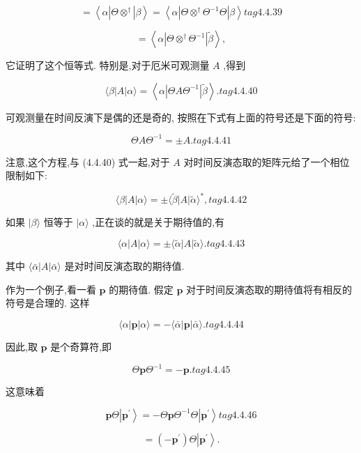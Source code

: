$$
= \left\langle {\alpha \left| {\Theta { \otimes }^{ \dagger }}\right| \beta }\right\rangle = \left\langle {\alpha \left| {\Theta { \otimes }^{ \dagger }{\Theta }^{-1}\Theta }\right| \beta }\right\rangle tag{4. 4.39}
$$

$$
= \left\langle {\alpha \left| {\Theta { \otimes }^{ \dagger }{\Theta }^{-1}}\right| \widetilde{\beta }}\right\rangle ,
$$

它证明了这个恒等式. 特别是,对于厄米可观测量 $A$ ,得到

$$
\langle \beta \left| A\right| \alpha \rangle = \left\langle {\alpha \left| {{\Theta A}{\Theta }^{-1}}\right| \widetilde{\beta }}\right\rangle . tag{4.4.40}
$$

可观测量在时间反演下是偶的还是奇的, 按照在下式有上面的符号还是下面的符号:

$$
{\Theta A}{\Theta }^{-1} = \pm A. tag{4.4.41}
$$

注意,这个方程,与 (4.4.40) 式一起,对于 $A$ 对时间反演态取的矩阵元给了一个相位限制如下:

$$
\langle \beta \left| A\right| \alpha \rangle = \pm \langle \widetilde{\beta }\left| A\right| \widetilde{\alpha }{\rangle }^{ * }, tag{4.4.42}
$$

如果 $|\beta \rangle$ 恒等于 $|\alpha \rangle$ ,正在谈的就是关于期待值的,有

$$
\langle \alpha \left| A\right| \alpha \rangle = \pm \langle \widetilde{\alpha }\left| A\right| \widetilde{\alpha }\rangle . tag{4. 4.43}
$$

其中 $\langle \bar{\alpha }\left| A\right| \bar{\alpha }\rangle$ 是对时间反演态取的期待值.

作为一个例子,看一看 $\mathbf{p}$ 的期待值. 假定 $\mathbf{p}$ 对于时间反演态取的期待值将有相反的符号是合理的. 这样

$$
\langle \alpha \left| \mathbf{p}\right| \alpha \rangle = - \langle \bar{\alpha }\left| \mathbf{p}\right| \bar{\alpha }\rangle . tag{4.4.44}
$$

因此,取 $\mathbf{p}$ 是个奇算符,即

$$
\Theta \mathbf{p}{\Theta }^{-1} = - \mathbf{p}. tag{4.4.45}
$$

这意味着

$$
\mathbf{p}\Theta \left| {\mathbf{p}}^{\prime }\right\rangle = - \Theta \mathbf{p}{\Theta }^{-1}\Theta \left| {\mathbf{p}}^{\prime }\right\rangle tag{4.4.46}
$$

$$
= \left( {-{\mathbf{p}}^{\prime }}\right) \Theta \left| {\mathbf{p}}^{\prime }\right\rangle \text{.}
$$

